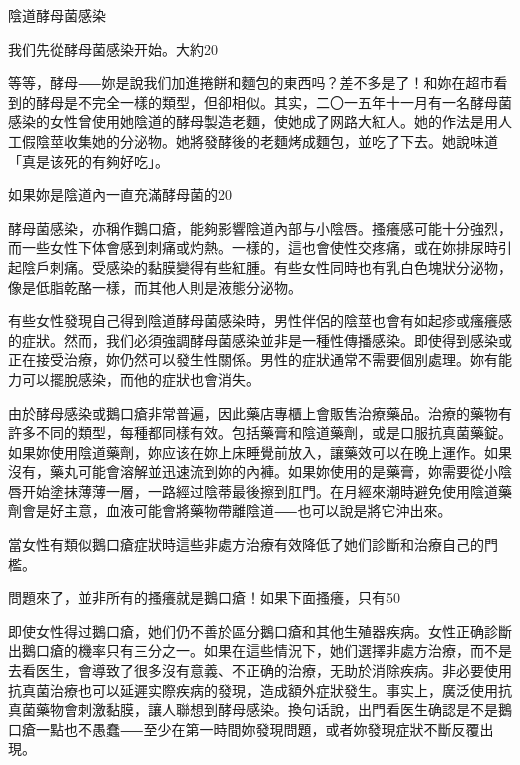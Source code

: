 \documentclass[12pt,UTF8]{ctexbook}
\begin{document}
陰道酵母菌感染




我们先從酵母菌感染开始。大約20%

等等，酵母⸺妳是說我们加進捲餅和麵包的東西吗？差不多是了！和妳在超市看到的酵母是不完全一樣的類型，但卻相似。其实，二〇一五年十一月有一名酵母菌感染的女性曾使用她陰道的酵母製造老麵，使她成了网路大紅人。她的作法是用人工假陰莖收集她的分泌物。她將發酵後的老麵烤成麵包，並吃了下去。她說味道「真是该死的有夠好吃」。

如果妳是陰道內一直充滿酵母菌的20%

酵母菌感染，亦稱作鵝口瘡，能夠影響陰道內部与小陰唇。搔癢感可能十分強烈，而一些女性下体會感到刺痛或灼熱。一樣的，這也會使性交疼痛，或在妳排尿時引起陰戶刺痛。受感染的黏膜變得有些紅腫。有些女性同時也有乳白色塊狀分泌物，像是低脂乾酪一樣，而其他人則是液態分泌物。

有些女性發現自己得到陰道酵母菌感染時，男性伴侶的陰莖也會有如起疹或瘙癢感的症狀。然而，我们必須強調酵母菌感染並非是一種性傳播感染。即使得到感染或正在接受治療，妳仍然可以發生性關係。男性的症狀通常不需要個別處理。妳有能力可以擺脫感染，而他的症狀也會消失。

由於酵母感染或鵝口瘡非常普遍，因此藥店專櫃上會販售治療藥品。治療的藥物有許多不同的類型，每種都同樣有效。包括藥膏和陰道藥劑，或是口服抗真菌藥錠。如果妳使用陰道藥劑，妳应该在妳上床睡覺前放入，讓藥效可以在晚上運作。如果沒有，藥丸可能會溶解並迅速流到妳的內褲。如果妳使用的是藥膏，妳需要從小陰唇开始塗抹薄薄一層，一路經过陰蒂最後擦到肛門。在月經來潮時避免使用陰道藥劑會是好主意，血液可能會將藥物帶離陰道⸺也可以說是將它沖出來。

當女性有類似鵝口瘡症狀時這些非處方治療有效降低了她们診斷和治療自己的門檻。

問題來了，並非所有的搔癢就是鵝口瘡！如果下面搔癢，只有50%

即使女性得过鵝口瘡，她们仍不善於區分鵝口瘡和其他生殖器疾病。女性正确診斷出鵝口瘡的機率只有三分之一。如果在這些情況下，她们選擇非處方治療，而不是去看医生，會導致了很多沒有意義、不正确的治療，无助於消除疾病。非必要使用抗真菌治療也可以延遲实際疾病的發現，造成額外症狀發生。事实上，廣泛使用抗真菌藥物會刺激黏膜，讓人聯想到酵母感染。換句话說，出門看医生确認是不是鵝口瘡一點也不愚蠢⸺至少在第一時間妳發現問題，或者妳發現症狀不斷反覆出現。
\end{document}
